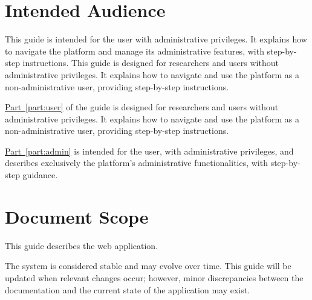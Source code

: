 	\vspace{2cm}
		
		
	\section*{Intended Audience}
	
	\rolecontent{\role}
	{%
		This guide is intended for the \admin user with administrative privileges. It explains how to navigate the \app platform and manage its administrative features, with step-by-step instructions.
	}	
	{%
		This guide is designed for researchers and users without administrative privileges. It explains how to navigate and use the \app platform as a non-administrative user, providing step-by-step instructions.
	}	
	{%
		\hyperref[part:user]{Part~\ref*{part:user}} of the guide is designed for researchers and users without administrative privileges. It explains how to navigate and use the \app platform as a non-administrative user, providing step-by-step instructions.
		
		\hyperref[part:admin]{Part~\ref*{part:admin}} is intended for the \admin user, with administrative privileges, and describes exclusively the platform’s administrative functionalities, with step-by-step guidance.
	}
	
	\vspace{2cm}
	
	\section*{Document Scope}
	
	This guide describes the \project web application.
	
	The system is considered stable and may evolve over time. This guide will be updated when relevant changes occur; however, minor discrepancies between the documentation and the current state of the application may exist.
	
		
	\newpage
	
    \setlength{\parskip}{0.3em}
    \tableofcontents
    \setlength{\parskip}{0.8em}
    
    \thispagestyle{empty} 	%
    \clearpage              %
    \setcounter{page}{1}    %
    \pagestyle{plain}       %
    
    \newpage
    
    \rolecontent{\role}
    {%
    }
    {%
    }
    {%
    	   
    	
    }
    
